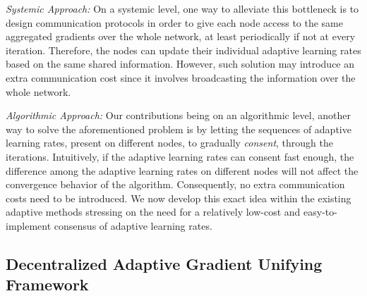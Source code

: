 \documentclass{article} %
\begin{document}
\textit{Systemic Approach:} 
On a systemic level, one way to alleviate this bottleneck is to design communication protocols in order to give each node access to the same aggregated gradients over the whole network, at least periodically if not at every iteration.
Therefore, the nodes can update their individual adaptive learning rates based on the same shared information. 
However, such solution may introduce an extra communication cost since it involves broadcasting the information over the whole network.

\textit{Algorithmic Approach:} 
Our contributions being on an algorithmic level, another way to solve the aforementioned problem is by letting the sequences of adaptive learning rates, present on different nodes, to gradually \emph{consent}, through the iterations. 
Intuitively, if the adaptive learning rates can consent fast enough, the difference among the adaptive learning rates on different nodes will not affect the convergence behavior of the algorithm.  
Consequently, no extra communication costs need to be introduced.
We now develop this exact idea within the existing adaptive methods stressing on the need for a relatively low-cost and easy-to-implement consensus of adaptive learning rates. 


\clearpage
\subsection{Decentralized Adaptive Gradient Unifying Framework}
\end{document}

